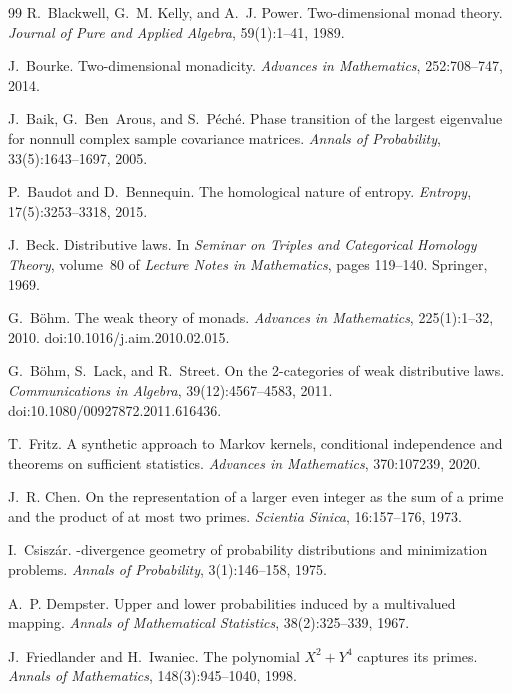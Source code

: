 \documentclass[11pt]{article}
\theoremstyle{definition}
\theoremstyle{remark}
\begin{document}
\begin{thebibliography}{99}
R.~Blackwell, G.~M. Kelly, and A.~J. Power.
\newblock Two-dimensional monad theory.
\newblock \emph{Journal of Pure and Applied Algebra}, 59(1):1--41, 1989.

J.~Bourke.
\newblock Two-dimensional monadicity.
\newblock \emph{Advances in Mathematics}, 252:708--747, 2014.

J.~Baik, G.~Ben~Arous, and S.~P\'ech\'e.
\newblock Phase transition of the largest eigenvalue for nonnull complex sample covariance matrices.
\newblock \emph{Annals of Probability}, 33(5):1643--1697, 2005.

P.~Baudot and D.~Bennequin.
\newblock The homological nature of entropy.
\newblock \emph{Entropy}, 17(5):3253--3318, 2015.

J.~Beck.
\newblock Distributive laws.
\newblock In \emph{Seminar on Triples and Categorical Homology Theory}, volume~80 of \emph{Lecture
  Notes in Mathematics}, pages 119--140. Springer, 1969.

G.~B\"ohm.
\newblock The weak theory of monads.
\newblock \emph{Advances in Mathematics}, 225(1):1--32, 2010.
\newblock doi:10.1016/j.aim.2010.02.015.

G.~B\"ohm, S.~Lack, and R.~Street.
\newblock On the 2-categories of weak distributive laws.
\newblock \emph{Communications in Algebra}, 39(12):4567--4583, 2011.
\newblock doi:10.1080/00927872.2011.616436.

T.~Fritz.
\newblock A synthetic approach to {M}arkov kernels, conditional independence and theorems on
  sufficient statistics.
\newblock \emph{Advances in Mathematics}, 370:107239, 2020.

J.~R. Chen.
\newblock On the representation of a larger even integer as the sum of a prime and the product of at
  most two primes.
\newblock \emph{Scientia Sinica}, 16:157--176, 1973.

I.~Csisz\'ar.
-divergence geometry of probability distributions and minimization problems.
\newblock \emph{Annals of Probability}, 3(1):146--158, 1975.

A.~P. Dempster.
\newblock Upper and lower probabilities induced by a multivalued mapping.
\newblock \emph{Annals of Mathematical Statistics}, 38(2):325--339, 1967.

J.~Friedlander and H.~Iwaniec.
\newblock The polynomial {$X^2+Y^4$} captures its primes.
\newblock \emph{Annals of Mathematics}, 148(3):945--1040, 1998.


\end{thebibliography}
\end{document}
